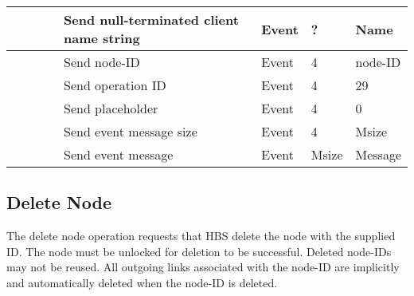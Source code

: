 \begin{tabular}{|p{1.2in}|p{.4in}|p{.4in}|p{.5in}|p{1.2in}|p{.4in}|p{.4in}|p{.5in} |}
                  &        &       &       & Send null-terminated client
                                             name string  & Event  &  ?    & Name  \\ \hline
                  &        &       &       & Send node-ID  & Event  &   4   &   node-ID    \\  \hline
                  &        &       &       & Send operation 
                                             ID           & Event  &   4   &  29   \\ \hline
                  &        &       &       & Send placeholder     & Event  &   4   &  0    \\ \hline
                  &        &       &       & Send event message
                                                  size    & Event  &   4   &  Msize \\ \hline
                  &        &       &       & Send event message
                                                          & Event  &  Msize&  Message  \\ \hline
\end{tabular}
\normalsize
\bigskip




\newpage
\subsection{Delete Node}


The delete node operation requests that HBS delete
the node with the supplied ID.  The node must be unlocked for 
deletion to be successful.  Deleted node-IDs may not be reused.
All outgoing links associated with the node-ID are implicitly
and automatically deleted when the node-ID is deleted.

